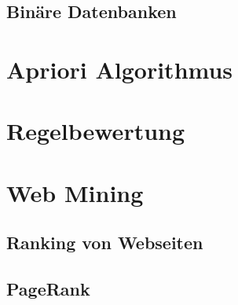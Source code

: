 		\subsection{Binäre Datenbanken} %

	\section{Apriori Algorithmus} %

	\section{Regelbewertung} %

	\section{Web Mining} %

		\subsection{Ranking von Webseiten} %

		\subsection{PageRank} %
